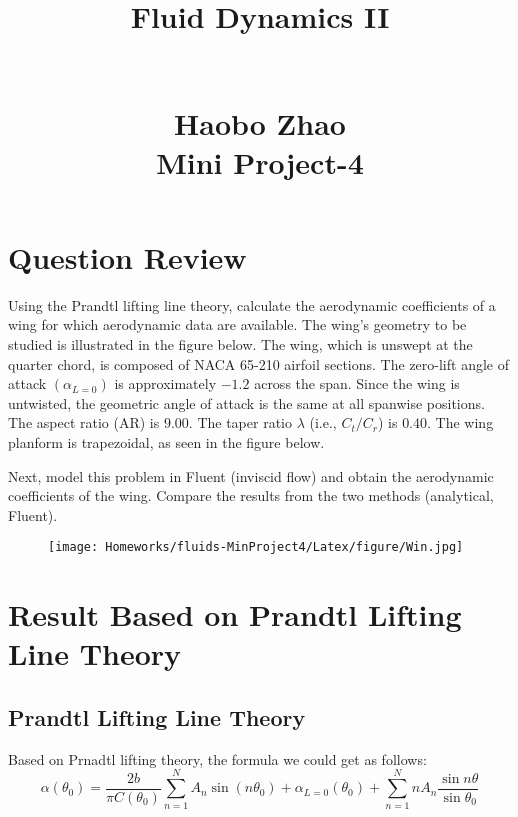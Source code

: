 \documentclass[12pt]{article}
\begin{document}
\title{\begin{Huge}Fluid Dynamics II\end{Huge}\\Haobo Zhao\\Mini Project-4}
\maketitle

\tableofcontents


\section{Question Review}

Using the Prandtl lifting line theory, calculate the aerodynamic coefficients of a wing for which aerodynamic data are available. The wing's geometry to be studied is illustrated in the figure below. The wing, which is unswept at the quarter chord, is composed of NACA 65-210 airfoil sections. The zero-lift angle of attack $(\alpha_{L=0})$ is approximately $-1.2$ across the span. Since the wing is untwisted, the geometric angle of attack is the same at all spanwise positions. The aspect ratio (AR) is $9.00$. The taper ratio $\lambda$ (i.e., $C_t/C_r$) is $0.40$. The wing planform is trapezoidal, as seen in the figure below.

Next, model this problem in Fluent (inviscid flow) and obtain the aerodynamic coefficients of the wing. Compare the results from the two methods (analytical, Fluent).

\begin{figure}[H]
    \centering
    \texttt{[image: Homeworks/fluids-MinProject4/Latex/figure/Win.jpg]}
    \label{IGs.jpg}
\end{figure}






\section{Result Based on Prandtl Lifting Line Theory}

\subsection{Prandtl Lifting Line Theory}
Based on Prnadtl lifting theory, the formula we could get as follows:
$$
\alpha(\theta_0) = \frac{2b}{\pi C(\theta_0)} \sum_{n=1}^{N} A_n \sin(n \theta_0) + \alpha_{L=0}(\theta_0) + \sum_{n=1}^{N} n A_n \frac{\sin n \theta}{\sin \theta_0}
$$
\end{document}
